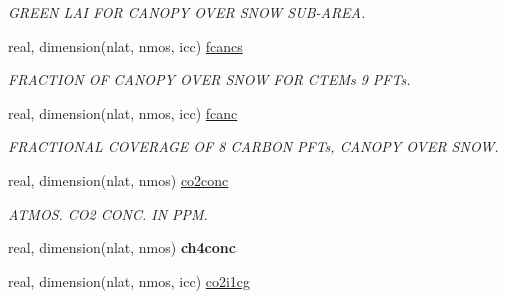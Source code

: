 \begin{DoxyCompactItemize}
\begin{DoxyCompactList}\small\item\em G\+R\+E\+E\+N L\+A\+I F\+O\+R C\+A\+N\+O\+P\+Y O\+V\+E\+R S\+N\+O\+W S\+U\+B-\/\+A\+R\+E\+A. \end{DoxyCompactList}\item 
\hypertarget{structctem__statevars_1_1veg__rot_ab8f5a96e2d8f4d6c8734ac69b2779bad}{}real, dimension(nlat, nmos, icc) \hyperlink{structctem__statevars_1_1veg__rot_ab8f5a96e2d8f4d6c8734ac69b2779bad}{fcancs}\label{structctem__statevars_1_1veg__rot_ab8f5a96e2d8f4d6c8734ac69b2779bad}

\begin{DoxyCompactList}\small\item\em F\+R\+A\+C\+T\+I\+O\+N O\+F C\+A\+N\+O\+P\+Y O\+V\+E\+R S\+N\+O\+W F\+O\+R C\+T\+E\+M\textquotesingle{}s 9 P\+F\+Ts. \end{DoxyCompactList}\item 
\hypertarget{structctem__statevars_1_1veg__rot_a9228dec50ca6ab736f02d7a12f274c68}{}real, dimension(nlat, nmos, icc) \hyperlink{structctem__statevars_1_1veg__rot_a9228dec50ca6ab736f02d7a12f274c68}{fcanc}\label{structctem__statevars_1_1veg__rot_a9228dec50ca6ab736f02d7a12f274c68}

\begin{DoxyCompactList}\small\item\em F\+R\+A\+C\+T\+I\+O\+N\+A\+L C\+O\+V\+E\+R\+A\+G\+E O\+F 8 C\+A\+R\+B\+O\+N P\+F\+Ts, C\+A\+N\+O\+P\+Y O\+V\+E\+R S\+N\+O\+W. \end{DoxyCompactList}\item 
\hypertarget{structctem__statevars_1_1veg__rot_a55dc73916b670f7aaee728093f58daed}{}real, dimension(nlat, nmos) \hyperlink{structctem__statevars_1_1veg__rot_a55dc73916b670f7aaee728093f58daed}{co2conc}\label{structctem__statevars_1_1veg__rot_a55dc73916b670f7aaee728093f58daed}

\begin{DoxyCompactList}\small\item\em A\+T\+M\+O\+S. C\+O2 C\+O\+N\+C. I\+N P\+P\+M. \end{DoxyCompactList}\item 
\hypertarget{structctem__statevars_1_1veg__rot_ae50c996234539d83fe489c6a90ecc7f5}{}real, dimension(nlat, nmos) {\bfseries ch4conc}\label{structctem__statevars_1_1veg__rot_ae50c996234539d83fe489c6a90ecc7f5}

\item 
\hypertarget{structctem__statevars_1_1veg__rot_a22710748e6d71576c2e8ff8254e8003b}{}real, dimension(nlat, nmos, icc) \hyperlink{structctem__statevars_1_1veg__rot_a22710748e6d71576c2e8ff8254e8003b}{co2i1cg}\label{structctem__statevars_1_1veg__rot_a22710748e6d71576c2e8ff8254e8003b}


\end{DoxyCompactItemize}
